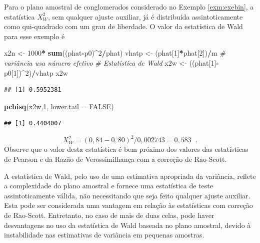 \documentclass[]{book}
\newenvironment{Shaded}{\begin{snugshade}}{\end{snugshade}}
\newcommand{\KeywordTok}[1]{\textcolor[rgb]{0.13,0.29,0.53}{\textbf{#1}}}
\newcommand{\DataTypeTok}[1]{\textcolor[rgb]{0.13,0.29,0.53}{#1}}
\newcommand{\DecValTok}[1]{\textcolor[rgb]{0.00,0.00,0.81}{#1}}
\newcommand{\StringTok}[1]{\textcolor[rgb]{0.31,0.60,0.02}{#1}}
\newcommand{\CommentTok}[1]{\textcolor[rgb]{0.56,0.35,0.01}{\textit{#1}}}
\newcommand{\OtherTok}[1]{\textcolor[rgb]{0.56,0.35,0.01}{#1}}
\newcommand{\OperatorTok}[1]{\textcolor[rgb]{0.81,0.36,0.00}{\textbf{#1}}}
\newcommand{\NormalTok}[1]{#1}
\theoremstyle{definition}
\theoremstyle{definition}
\theoremstyle{definition}
\theoremstyle{remark}
\begin{document}
Para o plano amostral de conglomerados considerado no Exemplo
\ref{exm:exebin}, a estatística \(X_{W}^{2}\), sem qualquer ajuste
auxiliar, já é distribuída assintoticamente como qui-quadrado com um
grau de liberdade. O valor da estatística de Wald para esse exemplo é

\begin{Shaded}
\begin{Highlighting}[]
\NormalTok{x2n <-}\StringTok{ }\DecValTok{1000}\OperatorTok{*}\StringTok{ }\KeywordTok{sum}\NormalTok{((phat}\OperatorTok{-}\NormalTok{p0)}\OperatorTok{^}\DecValTok{2}\OperatorTok{/}\NormalTok{phat)}
\NormalTok{vhatp <-}\StringTok{ }\NormalTok{(phat[}\DecValTok{1}\NormalTok{]}\OperatorTok{*}\NormalTok{phat[}\DecValTok{2}\NormalTok{])}\OperatorTok{/}\NormalTok{m }\CommentTok{# variância usa número efetivo}
\CommentTok{# Estatística de Wald}
\NormalTok{x2w <-}\StringTok{ }\NormalTok{((phat[}\DecValTok{1}\NormalTok{]}\OperatorTok{-}\NormalTok{p0[}\DecValTok{1}\NormalTok{])}\OperatorTok{^}\DecValTok{2}\NormalTok{)}\OperatorTok{/}\NormalTok{vhatp}
\NormalTok{x2w}
\end{Highlighting}
\end{Shaded}

\begin{verbatim}
## [1] 0.5952381
\end{verbatim}

\begin{Shaded}
\begin{Highlighting}[]
\KeywordTok{pchisq}\NormalTok{(x2w,}\DecValTok{1}\NormalTok{, }\DataTypeTok{lower.tail =} \OtherTok{FALSE}\NormalTok{)}
\end{Highlighting}
\end{Shaded}

\begin{verbatim}
## [1] 0.4404007
\end{verbatim}

\[
X_{W}^{2}=\left( 0,84-0,80\right) ^{2}/0,002743=0,583\;\;\mbox{.} 
\] Observe que o valor desta estatística é bem próximo dos valores das
estatísticas de Pearson e da Razão de Verossimilhança com a correção de
Rao-Scott.

A estatística de Wald, pelo uso de uma estimativa apropriada da
variância, reflete a complexidade do plano amostral e fornece uma
estatística de teste assintoticamente válida, não necessitando que seja
feito qualquer ajuste auxiliar. Esta pode ser considerada uma vantagem
em relação às estatísticas com correção de Rao-Scott. Entretanto, no
caso de mais de duas celas, pode haver desvantagens no uso da
estatística de Wald baseada no plano amostral, devido à instabilidade
nas estimativas de variância em pequenas amostras.
\end{document}
